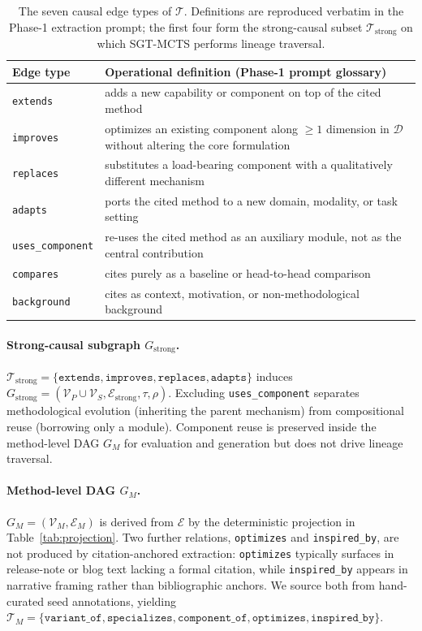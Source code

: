 \documentclass{opendatalab}
\begin{document}
\begin{table}[h]
\centering
\caption{The seven causal edge types of $\mathcal{T}$. Definitions are reproduced verbatim in the Phase-1
extraction prompt; the first four form the strong-causal subset $\mathcal{T}_{\text{strong}}$ on which SGT-MCTS
performs lineage traversal.}
\label{tab:edge-types}
\begin{tabularx}{\linewidth}{l X}
\toprule
Edge type & Operational definition (Phase-1 prompt glossary) \\
\midrule
\texttt{extends} & adds a new capability or component on top of the cited method \\
\texttt{improves} & optimizes an existing component along $\ge 1$ dimension in $\mathcal{D}$ without altering the
core formulation \\
\texttt{replaces} & substitutes a load-bearing component with a qualitatively different mechanism \\
\texttt{adapts} & ports the cited method to a new domain, modality, or task setting \\
\texttt{uses\_component} & re-uses the cited method as an auxiliary module, not as the central contribution \\
\texttt{compares} & cites purely as a baseline or head-to-head comparison \\
\texttt{background} & cites as context, motivation, or non-methodological background \\
\bottomrule
\end{tabularx}
\end{table}

\paragraph{Strong-causal subgraph $G_{\text{strong}}$.}
$\mathcal{T}_{\text{strong}}=\{\texttt{extends},\texttt{improves},\texttt{replaces},\texttt{adapts}\}$ induces $G_{\text{strong}}=(\mathcal{V}_P\cup\mathcal{V}_S,\mathcal{E}_{\text{strong}},\tau,
\rho)$. Excluding \texttt{uses\_component} separates methodological evolution (inheriting the parent mechanism) from compositional reuse (borrowing only a module). Component reuse is preserved inside the
method-level DAG $G_M$ for evaluation and generation but does not drive lineage traversal.

\paragraph{Method-level DAG $G_M$.}
$G_M=(\mathcal{V}_M,\mathcal{E}_M)$ is derived from $\mathcal{E}$ by the deterministic projection in
Table~\ref{tab:projection}. Two further relations, \texttt{optimizes} and \texttt{inspired\_by}, are not produced
by citation-anchored extraction: \texttt{optimizes} typically surfaces in release-note or blog text lacking a
formal citation, while \texttt{inspired\_by} appears in narrative framing rather than bibliographic anchors. We
source both from hand-curated seed annotations, yielding $\mathcal{T}_M=\{\texttt{variant\_of}, \texttt{specializes}, \texttt{component\_of},\texttt{optimizes},\texttt{inspired\_by}\}$.
\end{document}
